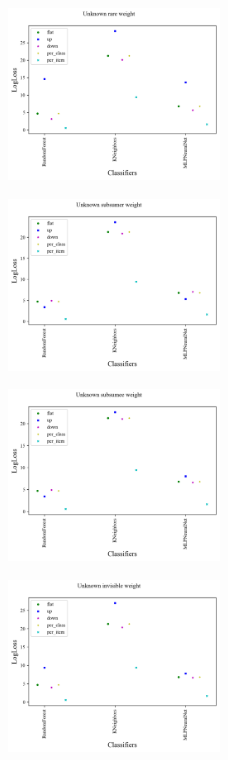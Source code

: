 \begin{figure}
	\begin{center}
		\includegraphics[width=0.5\textwidth]{./fig/systematic_Unknown_rare.png}
		\caption{}
		\label{fig:systematic_rare}
	\end{center}
\end{figure}

\begin{figure}
	\begin{center}
		\includegraphics[width=0.5\textwidth]{./fig/systematic_Unknown_subsumer.png}
		\caption{}
		\label{fig:systematic_subsumer}
	\end{center}
\end{figure}

\begin{figure}
	\begin{center}
		\includegraphics[width=0.5\textwidth]{./fig/systematic_Unknown_subsumee.png}
		\caption{}
		\label{fig:systematic_subsumee}
	\end{center}
\end{figure}

\begin{figure}
	\begin{center}
		\includegraphics[width=0.5\textwidth]{./fig/systematic_Unknown_invisible.png}
		\caption{}
		\label{fig:systematic_invisible}
	\end{center}
\end{figure}
